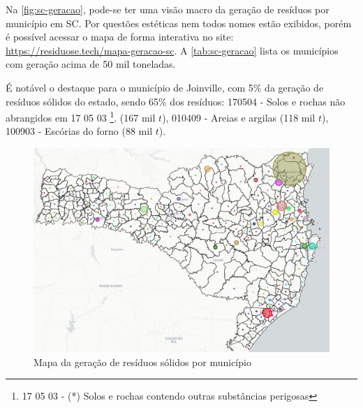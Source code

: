 Na \autoref{fig:sc-geracao}, pode-se ter uma visão macro da geração de resíduos por município em \gls{SC}. Por questões estéticas nem todos nomes estão exibidos, porém é possível acessar o mapa de forma interativa no site: \url{https://residuose.tech/mapa-geracao-sc}. A \autoref{tab:sc-geracao} lista os municípios com geração acima de 50 mil toneladas. 

É notável o destaque para o município de Joinville, com 5\% da geração de resíduos sólidos do estado, sendo 65\% dos resíduos: 170504 - Solos e rochas não abrangidos em 17 05 03 \footnote{17 05 03 - (*) Solos e rochas contendo outras substâncias perigosas}. (167 mil \ensuremath{t}),  010409 - Areias e argilas (118 mil \ensuremath{t}), 100903 - Escórias do forno (88 mil \ensuremath{t}).


\begin{figure}[htb]
	\caption{\label{fig:sc-geracao} Mapa da geração de resíduos sólidos por município}
	\begin{center}
		\includegraphics[scale=0.47]{images/sc-geracao.png}
	\end{center}
\end{figure}


